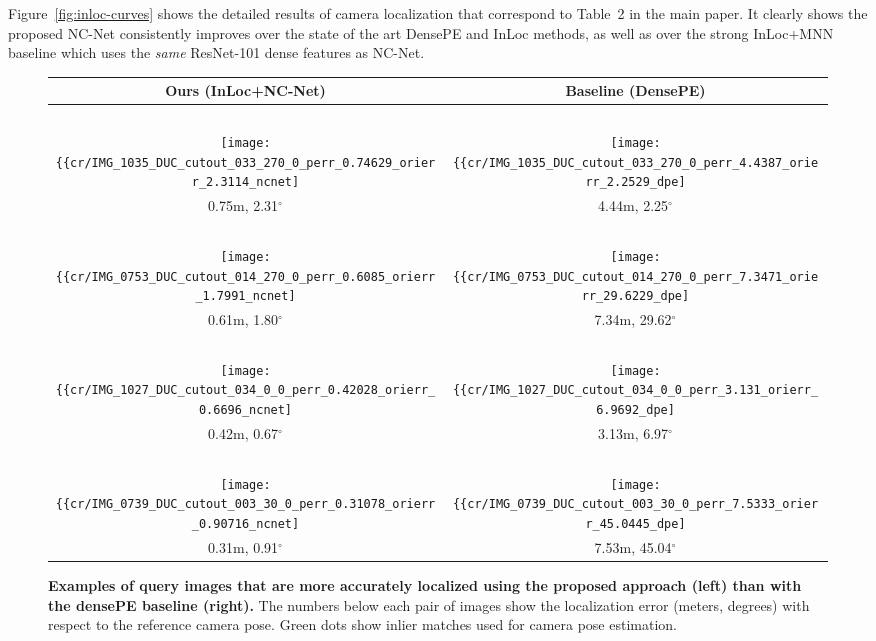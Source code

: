\documentclass{article}
\begin{document}
Figure~\ref{fig:inloc-curves} shows the detailed results of camera localization that correspond to Table~2 in the main paper. It clearly shows the proposed NC-Net consistently improves over the state of the art DensePE and InLoc methods, as well as over the strong InLoc+MNN baseline which uses the \emph{same} ResNet-101 dense features as NC-Net.

\begin{figure}[tbp]
  \centering
  \begingroup
  \renewcommand{\arraystretch}{0.5}
  \begin{tabular}{@{\hskip 1pt}c@{\hskip 6pt}|@{\hskip 6pt}c@{\hskip 1pt}}
    Ours (InLoc+NC-Net) & Baseline (DensePE) \\ \hline
    ~ & ~ \\ 
    \texttt{[image: \{\{cr/IMG\_1035\_DUC\_cutout\_033\_270\_0\_perr\_0.74629\_orierr\_2.3114\_ncnet]}}} &    \texttt{[image: \{\{cr/IMG\_1035\_DUC\_cutout\_033\_270\_0\_perr\_4.4387\_orierr\_2.2529\_dpe]}}} \\
    0.75m, 2.31$^\circ$ & 4.44m, 2.25$^\circ$ \\ \hline
    ~ & ~ \\ 
    \texttt{[image: \{\{cr/IMG\_0753\_DUC\_cutout\_014\_270\_0\_perr\_0.6085\_orierr\_1.7991\_ncnet]}}} &    \texttt{[image: \{\{cr/IMG\_0753\_DUC\_cutout\_014\_270\_0\_perr\_7.3471\_orierr\_29.6229\_dpe]}}} \\
    0.61m, 1.80$^\circ$ & 7.34m, 29.62$^\circ$ \\ \hline
    ~ & ~ \\ 
     \texttt{[image: \{\{cr/IMG\_1027\_DUC\_cutout\_034\_0\_0\_perr\_0.42028\_orierr\_0.6696\_ncnet]}}} &    \texttt{[image: \{\{cr/IMG\_1027\_DUC\_cutout\_034\_0\_0\_perr\_3.131\_orierr\_6.9692\_dpe]}}} \\
    0.42m, 0.67$^\circ$ & 3.13m, 6.97$^\circ$ \\ \hline
    ~ & ~ \\ 
     \texttt{[image: \{\{cr/IMG\_0739\_DUC\_cutout\_003\_30\_0\_perr\_0.31078\_orierr\_0.90716\_ncnet]}}} &    \texttt{[image: \{\{cr/IMG\_0739\_DUC\_cutout\_003\_30\_0\_perr\_7.5333\_orierr\_45.0445\_dpe]}}} \\
    0.31m, 0.91$^\circ$ & 7.53m, 45.04$^\circ$ \\ 
  \end{tabular}
  \endgroup
  \vspace{2pt}
  \caption{{\bf Examples of query images that are more accurately localized using the proposed approach (left) than with the densePE baseline (right).} The numbers below each pair of images show the localization error (meters, degrees) with respect to the reference camera pose. Green dots show inlier matches used for camera pose estimation.}
  \label{fig:densePE}
\end{figure}
\end{document}
